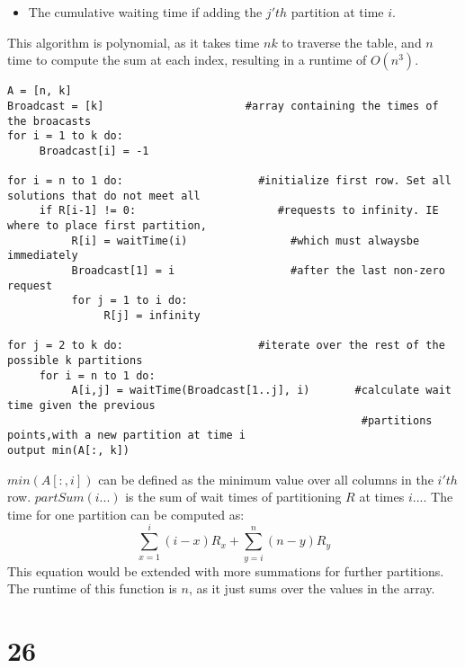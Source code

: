 \documentclass[letterpaper,notitlepage,twoside]{article}
\begin{document}
\begin{itemize}
\item The cumulative waiting time if adding the $j'th$ partition at time $i$. 
\end{itemize}
This algorithm is polynomial, as it takes time $nk$ to traverse the table, and $n$ time to compute the sum at each index, resulting in a runtime of $O(n^3)$. 
\begin{verbatim}
A = [n, k] 
Broadcast = [k]                      #array containing the times of the broacasts
for i = 1 to k do:
     Broadcast[i] = -1

for i = n to 1 do:                     #initialize first row. Set all solutions that do not meet all 
     if R[i-1] != 0:                      #requests to infinity. IE where to place first partition, 
          R[i] = waitTime(i)                #which must alwaysbe immediately 
          Broadcast[1] = i                  #after the last non-zero request
          for j = 1 to i do:
               R[j] = infinity         
               
for j = 2 to k do:                     #iterate over the rest of the possible k partitions 
     for i = n to 1 do:
          A[i,j] = waitTime(Broadcast[1..j], i)       #calculate wait time given the previous 
                                                       #partitions points,with a new partition at time i
output min(A[:, k])
\end{verbatim}
$min(A[:, i])$ can be defined as the minimum value over all columns in the $i'th$ row. $partSum(i...)$ is the sum of wait times of partitioning $R$ at times $i...$. The time for one partition can be computed as:
$$\sum_{x=1}^{i} (i-x)R_x + \sum_{y=i}^{n} (n-y)R_y $$
This equation would be extended with more summations for further partitions. The runtime of this function is $n$, as it just sums over the values in the array. 
\section*{26}
\end{document}
